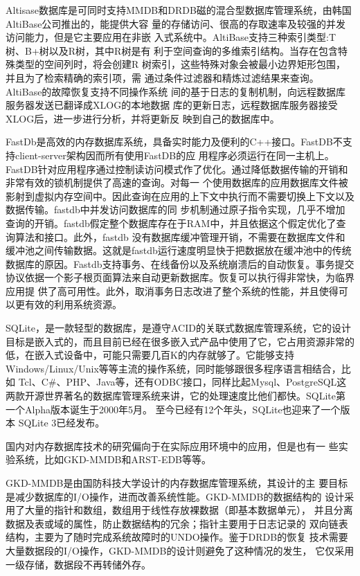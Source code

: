 \documentclass[proposal]{zjutreport}
\begin{document}
Altisase数据库是可同时支持MMDB和DRDB磁的混合型数据库管理系统，由韩国AltiBase公司推出的，能提供大容
量的存储访问、很高的存取速率及较强的并发访问能力，但是它主要应用在非嵌
入式系统中。AltiBase支持三种索引类型:T树、B+树以及R树，其中R树是有
利于空间查询的多维索引结构。当存在包含特殊类型的空间列时，将会创建R
树索引，这些特殊对象会被最小边界矩形包围，并且为了检索精确的索引项，需
通过条件过滤器和精炼过滤结果来查询。AltiBase的故障恢复支持不同操作系统
间的基于日志的复制机制，向远程数据库服务器发送已翻译成XLOG的本地数据
库的更新日志，远程数据库服务器接受XLOG后，进一步进行分析，并将更新反
映到自己的数据库中。

FastDb是高效的内存数据库系统，具备实时能力及便利的C++接口。FastDB不支持client-server架构因而所有使用FastDB的应 用程序必须运行在同一主机上。FastDB针对应用程序通过控制读访问模式作了优化。通过降低数据传输的开销和非常有效的锁机制提供了高速的查询。对每一 个使用数据库的应用数据库文件被影射到虚拟内存空间中。因此查询在应用的上下文中执行而不需要切换上下文以及数据传输。fastdb中并发访问数据库的同 步机制通过原子指令实现，几乎不增加查询的开销。fastdb假定整个数据库存在于RAM中，并且依据这个假定优化了查询算法和接口。此外，fastdb 没有数据库缓冲管理开销，不需要在数据库文件和缓冲池之间传输数据。这就是fastdb运行速度明显快于把数据放在缓冲池中的传统数据库的原因。Fastdb支持事务、在线备份以及系统崩溃后的自动恢复。事务提交协议依据一个影子根页面算法来自动更新数据库。恢复可以执行得非常快，为临界应用提 供了高可用性。此外，取消事务日志改进了整个系统的性能，并且使得可以更有效的利用系统资源。

SQLite，是一款轻型的数据库，是遵守ACID的关联式数据库管理系统，它的设计目标是嵌入式的，而且目前已经在很多嵌入式产品中使用了它，它占用资源非常的低，在嵌入式设备中，可能只需要几百K的内存就够了。它能够支持Windows/Linux/Unix等等主流的操作系统，同时能够跟很多程序语言相结合，比如 Tcl、C#、PHP、Java等，还有ODBC接口，同样比起Mysql、PostgreSQL这两款开源世界著名的数据库管理系统来讲，它的处理速度比他们都快。SQLite第一个Alpha版本诞生于2000年5月。 至今已经有12个年头，SQLite也迎来了一个版本 SQLite 3已经发布。

国内对内存数据库技术的研究偏向于在实际应用环境中的应用，但是也有一
些实验系统，比如GKD-MMDB和ARST-EDB等等。

GKD-MMDB是由国防科技大学设计的内存数据库管理系统，其设计的主
要目标是减少数据库的I/O操作，进而改善系统性能。GKD-MMDB的数据结构的
设计采用了大量的指针和数组，数组用于线性存放裸数据（即基本数据单元），
并且分离数据及表或域的属性，防止数据结构的冗余；指针主要用于日志记录的
双向链表结构，主要为了随时完成系统故障时的UNDO操作。鉴于DRDB的恢复
技术需要大量数据段的I/O操作，GKD-MMDB的设计则避免了这种情况的发生，
它仅采用一级存储，数据段不再转储外存。
\end{document}
